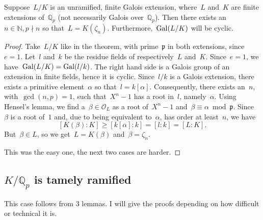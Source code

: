 \begin{theorem}
  Suppose~$L/K$ is an unramified, finite Galois extension, where~$L$ and~$K$ are finite extensions of~$\mathbb{Q}_p$ (not necessarily Galois over~$\mathbb{Q}_p$). Then there exists an~$n \in \mathbb{N},p \nmid n$ so that~$L = K(\zeta_n)$. Furthermore,~$\operatorname{Gal}(L/K)$ will be cyclic.

  \begin{proof}
    Take~$L/K$ like in the theorem, with prime~$\mathfrak{p}$ in both extensions, since~$e=1$. Let~$l$ and~$k$ be the residue fields of respectively~$L$ and~$K$. Since~$e = 1$, we have~$\operatorname{Gal}(L/K) = \operatorname{Gal}(l/k)$. The right hand side is a Galois group of an extension in finite fields, hence it is cyclic. Since~$l/k$ is a Galois extension, there exists a primitive element~$\alpha$ so that~$l = k[\alpha]$. Consequently, there exists an~$n$, with~$\gcd(n,p)=1$, such that~$X^n-1$ has a root in~$l$, namely~$\alpha$. Using Hensel's lemma, we find a~$\beta \in \mathcal{O}_L$ as a root of~$X^n-1$ and~$\beta \equiv \alpha \bmod \mathfrak{p}$. Since~$\beta$ is a root of~$1$ and, due to being equivalent to~$\alpha$, has order at least~$n$, we have
    \begin{equation}
      \left[K(\beta):K\right] \geq \left[k[\alpha]:k\right] = \left[l:k\right] = \left[L:K\right]. 
    \end{equation}
    But~$\beta \in L$, so we get~$L = K(\beta)$ and~$\beta = \zeta_n$.

    This was the easy one, the next two cases are harder.
  \end{proof}
\end{theorem}

\subsection{$K/\mathbb{Q}_p$ is tamely ramified}
This case follows from 3 lemmas. I will give the proofs depending on how difficult or technical it is.

